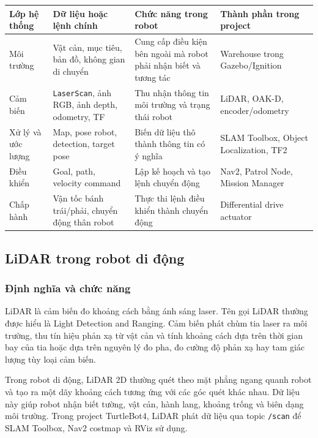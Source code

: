 \renewcommand{\arraystretch}{1.25}
\begin{longtable}{|
  >{\raggedright\arraybackslash}p{}|
  >{\raggedright\arraybackslash}p{}|
  >{\raggedright\arraybackslash}p{}|
  >{\raggedright\arraybackslash}p{}|}
\hline
\textbf{Lớp hệ thống} & \textbf{Dữ liệu hoặc lệnh chính} & \textbf{Chức năng trong robot} & \textbf{Thành phần trong project} \\ \hline
\hline
\endhead
\hline
\endlastfoot
Môi trường & Vật cản, mục tiêu, bản đồ, không gian di chuyển & Cung cấp
điều kiện bên ngoài mà robot phải nhận biết và tương tác & Warehouse
trong Gazebo/Ignition \\ \hline
Cảm biến & \texttt{LaserScan}, ảnh RGB, ảnh depth, odometry, TF & Thu
nhận thông tin môi trường và trạng thái robot & LiDAR, OAK-D,
encoder/odometry \\ \hline
Xử lý và ước lượng & Map, pose robot, detection, target pose & Biến dữ
liệu thô thành thông tin có ý nghĩa & SLAM Toolbox, Object Localization,
TF2 \\ \hline
Điều khiển & Goal, path, velocity command & Lập kế hoạch và tạo lệnh
chuyển động & Nav2, Patrol Node, Mission Manager \\ \hline
Chấp hành & Vận tốc bánh trái/phải, chuyển động thân robot & Thực thi
lệnh điều khiển thành chuyển động & Differential drive actuator \\ \hline
\end{longtable}

\subsection{LiDAR trong robot di động}\label{subsec:lidar}

\subsubsection{Định nghĩa và chức năng}

LiDAR là cảm biến đo khoảng cách bằng ánh sáng laser. Tên gọi LiDAR
thường được hiểu là Light Detection and Ranging. Cảm biến phát chùm tia
laser ra môi trường, thu tín hiệu phản xạ từ vật cản và tính khoảng cách
dựa trên thời gian bay của tia hoặc dựa trên nguyên lý đo pha, đo cường
độ phản xạ hay tam giác lượng tùy loại cảm biến.

Trong robot di động, LiDAR 2D thường quét theo mặt phẳng ngang quanh
robot và tạo ra một dãy khoảng cách tương ứng với các góc quét khác
nhau. Dữ liệu này giúp robot nhận biết tường, vật cản, hành lang, khoảng
trống và biên dạng môi trường. Trong project TurtleBot4, LiDAR phát dữ
liệu qua topic \texttt{/scan} để SLAM Toolbox, Nav2 costmap và RViz sử
dụng.

